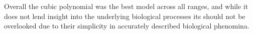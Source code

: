 \documentclass[11pt]{article}
\begin{document}
	Overall the cubic polynomial was the best model across all ranges, and while it does not lend insight into the underlying biological processes its should not be overlooked due to their simplicity in accurately described biological phenomina. 
	
	\newpage
	
	

	
\end{document}
